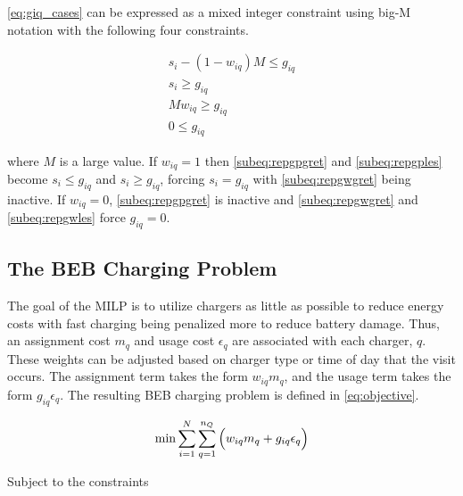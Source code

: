 \documentclass[utf8]{FrontiersinHarvard}
\begin{document}
\autoref{eq:giq_cases} can be expressed as a mixed integer constraint using big-M notation with the following four
constraints.

\begin{subequations}
    \label{eq:slack_gain}
\begin{align}
    s_i - (1 - w_{iq})M \leq g_{iq}  \label{subeq:repgpgret} \\
    s_i \geq g_{iq}                 \label{subeq:repgples} \\
    Mw_{iq} \geq g_{iq}              \label{subeq:repgwgret} \\
    0 \leq g_{iq}                   \label{subeq:repgwles}
\end{align}
\end{subequations}

\noindent
where \(M\) is a large value. If \(w_{iq} = 1\) then \autoref{subeq:repgpgret} and \autoref{subeq:repgples} become \(s_i \leq
g_{iq}\) and \(s_i \geq g_{iq}\), forcing \(s_i = g_{iq}\) with \autoref{subeq:repgwgret} being inactive. If \(w_{iq} = 0\),
\autoref{subeq:repgpgret} is inactive and \autoref{subeq:repgwgret} and \autoref{subeq:repgwles} force \(g_{iq} = 0\).

\subsection{The BEB Charging Problem}
\label{sec:BEB_MILP}
The goal of the MILP is to utilize chargers as little as possible to reduce energy costs with fast charging being
penalized more to reduce battery damage. Thus, an assignment cost \(m_q\) and usage cost \(\epsilon_q\) are associated with each
charger, \(q\). These weights can be adjusted based on charger type or time of day that the visit occurs. The assignment
term takes the form \(w_{iq}m_q\), and the usage term takes the form \(g_{iq} \epsilon_q\). The resulting BEB charging problem is
defined in \autoref{eq:objective}.

\begin{equation}
\label{eq:objective}
	\min \sum_{i=1}^N \sum_{q=1}^{n_Q} \Big( w_{iq} m_q + g_{iq} \epsilon_q \Big) \\
\end{equation}

Subject to the constraints
\end{document}
